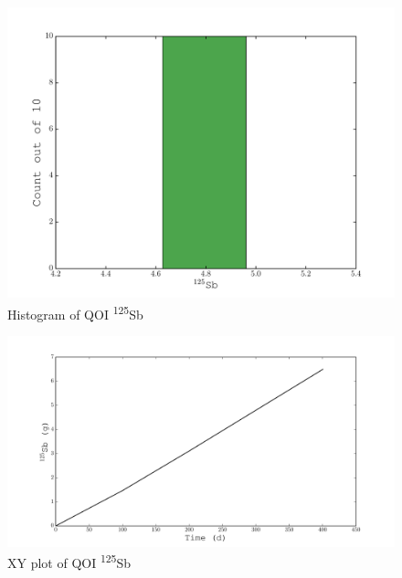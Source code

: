 \documentclass[11pt,notitlepage]{article}
\newcommand{\tss}{\textsuperscript}
\begin{document}
  \begin{figure}[H]
    \begin{center}
      \includegraphics[width=0.77\columnwidth]{../Origen2/PLOTS/SB125Post_HIST.pdf}
      \vspace{-5mm}
      \caption{Histogram of QOI \tss{125}Sb}
      \label{fig:POSTHISTSb125}
    \end{center}
  \end{figure}

    \begin{figure}[H]
    \begin{center}
      \includegraphics[width=0.77\columnwidth]{../Origen2/PLOTS/SB125Post_XY.pdf}
      \vspace{-5mm}
      \caption{XY plot of QOI \tss{125}Sb}
      \label{fig:POSTXYSb125}
    \end{center}
  \end{figure}
\end{document}
